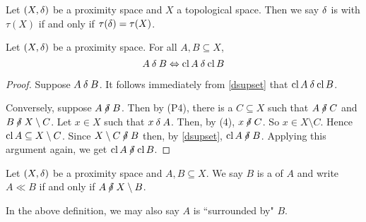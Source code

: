 \begin{definition}
	Let \( (X,\mathord{\delta}) \) be a proximity space and \( X \) a topological space.  Then we say \( \mathord{\delta} \) is  with \( \tau(X) \) if and only if \( \tau(\mathord{\delta}) = \tau(X) \).
\end{definition}

\begin{proposition}
	\label{deltaclosuresnear}
	Let \( (X,\mathord{\delta}) \) be a proximity space.  For all \( A,B \subseteq X \),
	\[ A \mathbin{\delta} B \Leftrightarrow \operatorname{cl}{A} \mathbin{\delta} \operatorname{cl}{B} \]
\end{proposition}
\begin{proof}
	Suppose \( A \mathbin{\delta} B \).  It follows immediately from \ref{dsupset} that \( \operatorname{cl}{A} \mathbin{\delta} \operatorname{cl}{B} \).
		
	Conversely, suppose \( A \nnear B \).  Then by (P4), there is a \( C \subseteq X \) such that \( A \nnear C \) and \( B \nnear X \setminus C \).  Let \( x \in X \) such that \( x \mathbin{\delta} A \).  Then, by (4), \( x \nnear C \).  So \( x \in X \setminus C \).  Hence \( \operatorname{cl}{A} \subseteq X \setminus C \).  Since \( X \setminus C \nnear B \) then, by \ref{dsupset}, \( \cl{A} \nnear B \).  Applying this argument again, we get \( \cl{A} \nnear \cl{B} \).
\end{proof}

\begin{definition}
	Let \( (X,\mathord{\delta}) \) be a proximity space and \( A,B \subseteq X \).  We say \( B \) is a \mdefn{\near} of \( A \) and write \( A \ll B \) if and only if \( A \nnear X \setminus B \).
\end{definition}

In the above definition, we may also say \( A \) is ``surrounded by" \( B \).

